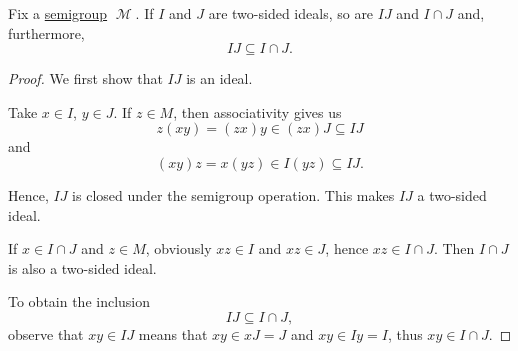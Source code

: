 \begin{proposition}\label{thm:product_of_semigroup_ideals_is_in_intersection}
  Fix a \hyperref[def:magma/associative]{semigroup} \( \mscrM \). If \( I \) and \( J \) are two-sided ideals, so are \( IJ \) and \( I \cap J \) and, furthermore,
  \begin{equation*}
    IJ \subseteq I \cap J.
  \end{equation*}
\end{proposition}
\begin{proof}
  We first show that \( IJ \) is an ideal.

  Take \( x \in I \), \( y \in J \). If \( z \in M \), then associativity gives us
  \begin{equation*}
    z(xy) = (zx)y \in (zx)J \subseteq IJ
  \end{equation*}
  and
  \begin{equation*}
    (xy)z = x(yz) \in I(yz) \subseteq IJ.
  \end{equation*}

  Hence, \( IJ \) is closed under the semigroup operation. This makes \( IJ \) a two-sided ideal.

  If \( x \in I \cap J \) and \( z \in M \), obviously \( xz \in I \) and \( xz \in J \), hence \( xz \in I \cap J \). Then \( I \cap J \) is also a two-sided ideal.

  To obtain the inclusion
  \begin{equation*}
    IJ \subseteq I \cap J,
  \end{equation*}
  observe that \( xy \in IJ \) means that \( xy \in xJ = J \) and \( xy \in Iy = I \), thus \( xy \in I \cap J \).
\end{proof}
